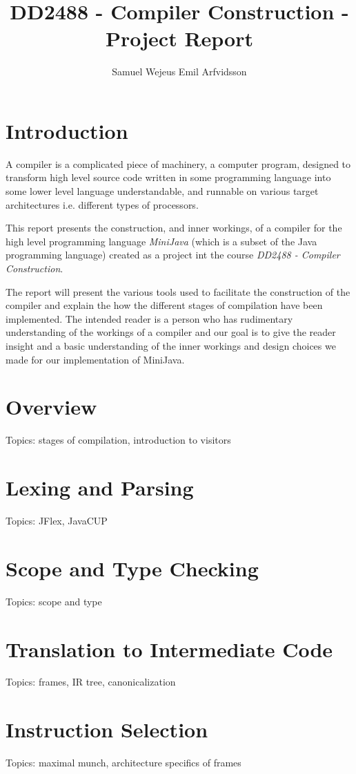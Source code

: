 \documentclass[11pt]{amsart}
\title{DD2488 - Compiler Construction - Project Report}
\author{Samuel Wejeus Emil Arfvidsson}
\begin{document}
\maketitle

\section{Introduction}
A compiler is a complicated piece of machinery, a computer program, designed to transform high level source code written in some programming language into some lower level language understandable, and runnable on various target architectures i.e. different types of processors.

This report presents the construction, and inner workings, of a compiler for the high level programming language \textit{MiniJava} (which is a subset of the Java programming language) created as a project int the course \textit{DD2488 - Compiler Construction}\cite{appel}. 

The report will present the various tools used to facilitate the construction of the compiler and explain the how the different stages of compilation have been implemented. The intended reader is a person who has rudimentary understanding of the workings of a compiler and our goal is to give the reader insight and a basic understanding of the inner workings and design choices we made for our implementation of MiniJava.

\section{Overview}
Topics: stages of compilation, introduction to visitors

\section{Lexing and Parsing}
Topics: JFlex, JavaCUP

\section{Scope and Type Checking}
Topics: scope and type

\section{Translation to Intermediate Code}
Topics: frames, IR tree, canonicalization

\section{Instruction Selection}
Topics: maximal munch, architecture specifics of frames
\end{document}

